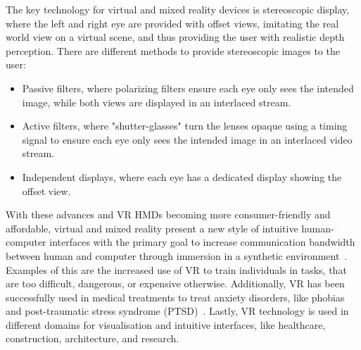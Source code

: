 The key technology for virtual and mixed reality devices is stereoscopic display, where the left and right eye are
provided with offset views, imitating the real world view on a virtual scene, and thus providing the user with
realistic depth perception.
There are different methods to provide stereoscopic images to the user:
\begin{itemize}
    \item Passive filters, where polarizing filters ensure each eye only sees the intended image, while both views
    are displayed in an interlaced stream.
    \item Active filters, where "shutter-glasses" turn the lenses opaque using a timing signal to ensure each eye
    only sees the intended image in an interlaced video stream.
    \item Independent displays, where each eye has a dedicated display showing the offset view.
\end{itemize}

With these advances and VR HMDs becoming more consumer-friendly and affordable, virtual and mixed reality present a
new style of intuitive human-computer interfaces with the primary goal to increase communication bandwidth between
human and computer through immersion in a synthetic environment~\cite{Davis2014}.
Examples of this are the increased use of VR to train individuals in tasks, that are too difficult, dangerous, or
expensive otherwise.
Additionally, VR has been successfully used in medical treatments to treat anxiety disorders, like phobias and
post-traumatic stress syndrome (PTSD)~\cite{Clifton2020}.
Lastly, VR technology is used in different domains for visualisation and intuitive interfaces, like healthcare,
construction, architecture, and research.
